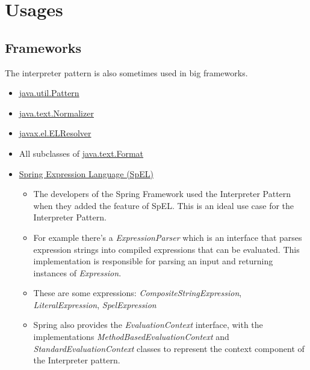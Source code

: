\chapter {Usages}

\section{Frameworks}

The interpreter pattern is also sometimes used in big frameworks. 

\begin{itemize}
    \item \href{http://docs.oracle.com/javase/8/docs/api/java/util/regex/Pattern.html}{java.util.Pattern} 
    \item \href{http://docs.oracle.com/javase/8/docs/api/java/text/Normalizer.html}{java.text.Normalizer} 
    \item \href{http://docs.oracle.com/javaee/7/api/javax/el/ELResolver.html}{javax.el.ELResolver} 
    \item All subclasses of \href{http://docs.oracle.com/javase/8/docs/api/java/text/Format.html}{java.text.Format}
    \item \href{https://docs.spring.io/spring/docs/current/spring-framework-reference/core.html#expressions}{Spring Expression Language (SpEL)}
    \begin{itemize}
        \item  The developers of the Spring Framework used the Interpreter Pattern when they added the feature of SpEL. This is an ideal use case for the Interpreter Pattern.
        \item For example there's a \textit{ExpressionParser} which is an interface that parses expression strings into compiled expressions that can be evaluated. This implementation is responsible for parsing an input and returning instances of \textit{Expression}.
        \item These are some expressions: \textit{CompositeStringExpression}, \textit{LiteralExpression}, \textit{SpelExpression}
        \item Spring also provides the \textit{EvaluationContext} interface, with the implementations \textit{MethodBasedEvaluationContext} and \textit{StandardEvaluationContext} classes to represent the context component of the Interpreter pattern.
    \end{itemize}
\end{itemize}


